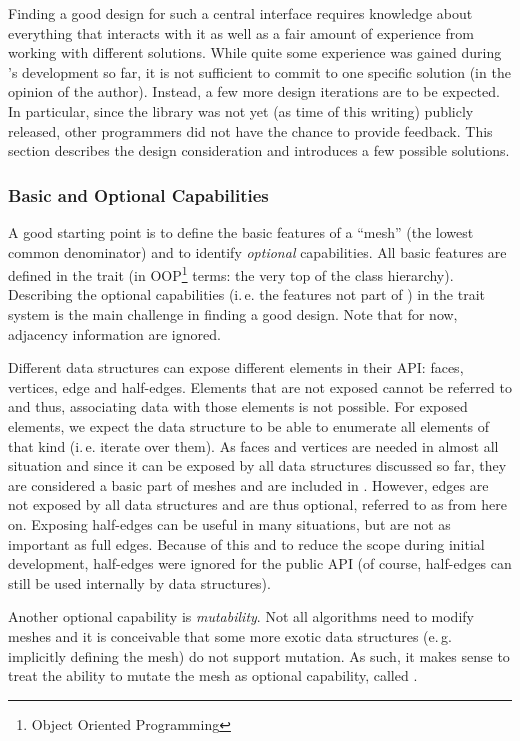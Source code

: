 Finding a good design for such a central interface requires knowledge about everything that interacts with it as well as a fair amount of experience from working with different solutions.
While quite some experience was gained during 's development so far, it is not sufficient to commit to one specific solution (in the opinion of the author).
Instead, a few more design iterations are to be expected.
In particular, since the library was not yet (as time of this writing) publicly released, other programmers did not have the chance to provide feedback.
This section describes the design consideration and introduces a few possible solutions.


\subsubsection*{Basic and Optional Capabilities}

A good starting point is to define the basic features of a \enquote{mesh} (the lowest common denominator) and to identify \emph{optional} capabilities.
All basic features are defined in the trait  (in OOP\footnote{Object Oriented Programming} terms: the very top of the class hierarchy).
Describing the optional capabilities (i.\,e. the features not part of ) in the trait system is the main challenge in finding a good design.
Note that for now, adjacency information are ignored.

Different data structures can expose different elements in their API: faces, vertices, edge and half-edges.
Elements that are not exposed cannot be referred to and thus, associating data with those elements is not possible.
For exposed elements, we expect the data structure to be able to enumerate all elements of that kind (i.\,e. iterate over them).
As faces and vertices are needed in almost all situation and since it can be exposed by all data structures discussed so far, they are considered a basic part of meshes and are included in .
However, edges are not exposed by all data structures and are thus optional, referred to as  from here on.
Exposing half-edges can be useful in many situations, but are not as important as full edges.
Because of this and to reduce the scope during initial development, half-edges were ignored for the public API (of course, half-edges can still be used internally by data structures).

Another optional capability is \emph{mutability}.
Not all algorithms need to modify meshes and it is conceivable that some more exotic data structures (e.\,g. implicitly defining the mesh) do not support mutation.
As such, it makes sense to treat the ability to mutate the mesh as optional capability, called .

